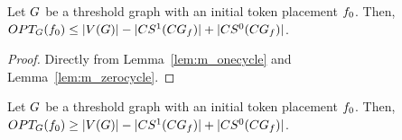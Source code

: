 \documentclass[msc]{ppgccufmg}    %
\begin{document}

\begin{lemma}
\label{lem:ub_threshold}
Let $G$ be a threshold graph with an initial token placement $f_{0}$.
Then, $OPT_{G}(f_{0}) \leq |V(G)| - 
|CS^{1}(CG_{f})| +
|CS^{0}(CG_{f})|$.
\end{lemma}

\begin{proof}
Directly from Lemma~\ref{lem:m_onecycle} and Lemma~\ref{lem:m_zerocycle}.
\end{proof}

\begin{lemma}
\label{lem:lb_threshold}
Let $G$ be a threshold graph with an initial token placement $f_{0}$.
Then, $OPT_{G}(f_{0}) \geq |V(G)| - 
|CS^{1}(CG_{f})| +
|CS^{0}(CG_{f})|$.
\end{lemma}
\end{document}
